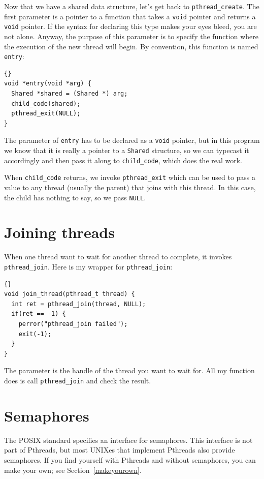 \documentclass{book}
\begin{document}
Now that we have a shared data structure, let's get back to
    {\tt pthread\_create}.
The first parameter is a pointer to a function that takes
a {\tt void} pointer and returns a {\tt void} pointer.  If the syntax
for declaring this type makes your eyes bleed, you are not alone.
Anyway, the purpose of this parameter is to specify the function where
the execution of the new thread will begin.  By convention, this
function is named {\tt entry}:

\begin{lstlisting}[title={}]{}
void *entry(void *arg) {
  Shared *shared = (Shared *) arg;
  child_code(shared);
  pthread_exit(NULL);
}
\end{lstlisting}

The parameter of {\tt entry} has to be declared as a {\tt void}
pointer, but in this program we know that it is really a pointer to a
    {\tt Shared} structure, so we can typecast it accordingly and then
pass it along to {\tt child\_code}, which does the real work.

When {\tt child\_code} returns, we invoke {\tt pthread\_exit}
which can be used to pass a value to any thread (usually the
parent) that joins with this thread.  In this case, the child
has nothing to say, so we pass {\tt NULL}.


\section{Joining threads}

When one thread want to wait for another thread to complete,
it invokes {\tt pthread\_join}.
Here is my wrapper for {\tt pthread\_join}:

\begin{lstlisting}[title={}]{}
void join_thread(pthread_t thread) {
  int ret = pthread_join(thread, NULL);
  if(ret == -1) {
    perror("pthread_join failed");
    exit(-1);
  }
}
\end{lstlisting}

The parameter is the handle of the thread you want to wait for.
All my function does is call {\tt pthread\_join} and check the
result.


\section{Semaphores}

The POSIX standard specifies an interface for semaphores.
This interface is not part of Pthreads, but most UNIXes
that implement Pthreads also provide semaphores.  If you
find yourself with Pthreads and without semaphores, you
can make your own; see Section~\ref{makeyourown}.
\end{document}
